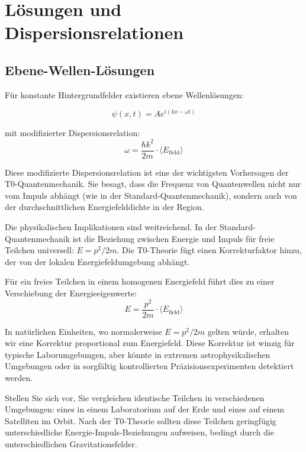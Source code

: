 \documentclass[12pt,a4paper]{article}
\theoremstyle{definition}
\theoremstyle{remark}
\begin{document}
\section{Lösungen und Dispersionsrelationen}

\subsection{Ebene-Wellen-Lösungen}

Für konstante Hintergrundfelder existieren ebene Wellenlösungen:

\begin{equation}
	\psi(x,t) = A e^{i(kx - \omega t)}
	\label{eq:plane_wave}
\end{equation}

mit modifizierter Dispersionsrelation:
\begin{equation}
	\boxed{\omega = \frac{\hbar k^2}{2m} \cdot \langle E_{\text{field}} \rangle}
	\label{eq:modified_dispersion}
\end{equation}

Diese modifizierte Dispersionsrelation ist eine der wichtigsten Vorhersagen der T0-Quantenmechanik. Sie besagt, dass die Frequenz von Quantenwellen nicht nur vom Impuls abhängt (wie in der Standard-Quantenmechanik), sondern auch von der durchschnittlichen Energiefelddichte in der Region.

Die physikalischen Implikationen sind weitreichend. In der Standard-Quantenmechanik ist die Beziehung zwischen Energie und Impuls für freie Teilchen universell: $E = p^2/2m$. Die T0-Theorie fügt einen Korrekturfaktor hinzu, der von der lokalen Energiefeldumgebung abhängt.

Für ein freies Teilchen in einem homogenen Energiefeld führt dies zu einer Verschiebung der Energieeigenwerte:
$$E = \frac{p^2}{2m} \cdot \langle E_{\text{field}} \rangle$$

In natürlichen Einheiten, wo normalerweise $E = p^2/2m$ gelten würde, erhalten wir eine Korrektur proportional zum Energiefeld. Diese Korrektur ist winzig für typische Laborumgebungen, aber könnte in extremen astrophysikalischen Umgebungen oder in sorgfältig kontrollierten Präzisionsexperimenten detektiert werden.

Stellen Sie sich vor, Sie vergleichen identische Teilchen in verschiedenen Umgebungen: eines in einem Laboratorium auf der Erde und eines auf einem Satelliten im Orbit. Nach der T0-Theorie sollten diese Teilchen geringfügig unterschiedliche Energie-Impuls-Beziehungen aufweisen, bedingt durch die unterschiedlichen Gravitationsfelder.
\end{document}
